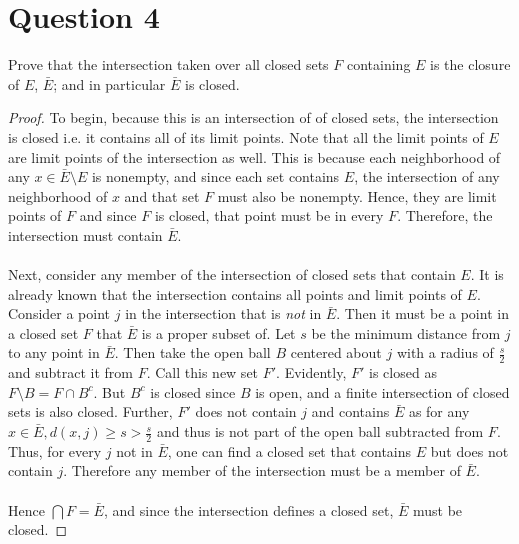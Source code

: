 \documentclass[12pt, letterpaper]{article}
\begin{document}
\section*{Question 4}
Prove that the intersection taken over all closed sets $F$ containing $E$ is the closure of $E$, $\bar E$; and in particular $\bar E$ is closed.
\begin{proof}
  To begin, because this is an intersection of of closed sets, the intersection is closed i.e. it contains all of its limit points.
  Note that all the limit points of $E$ are limit points of the intersection as well. This is because each neighborhood of any $x \in \bar E \setminus E$ is nonempty, and since each set contains
  $E$, the intersection of any neighborhood of $x$ and that set $F$ must also be nonempty. Hence, they are limit points of $F$ and since $F$ is closed, that point must be in every $F$.
  Therefore, the intersection must contain $\bar E$.\\
  \\
  Next, consider any member of the intersection of closed sets that contain $E$. It is already known that the intersection contains all points and limit points of $E$. Consider a point $j$
  in the intersection that is \textit{not} in $\bar E$. Then it must be a point in a closed set $F$ that $\bar E$ is a proper subset of. Let $s$ be the minimum distance from $j$ to any
  point in $\bar E$. Then take the open ball $B$ centered about $j$ with a radius of $\frac{s}{2}$ and subtract it from $F$. Call this new set $F'$. Evidently, $F'$ is closed as
  $F \setminus B = F \cap B^c$. But $B^c$ is closed since $B$ is open, and a finite intersection of closed sets is also closed. Further, $F'$ does not contain $j$ and contains
  $\bar E$ as for any $x \in \bar E, d(x, j) \geq s > \frac{s}{2}$ and thus is not part of the open ball subtracted from $F$. Thus, for every $j$ not in $\bar E$, one can find a
  closed set that contains $E$ but does not contain $j$. Therefore any member of the intersection must be a member of $\bar E$.\\
  \\
  Hence $\bigcap F = \bar E$, and since the intersection defines a closed set, $\bar E$ must be closed.
\end{proof}
\pagebreak
\end{document}
